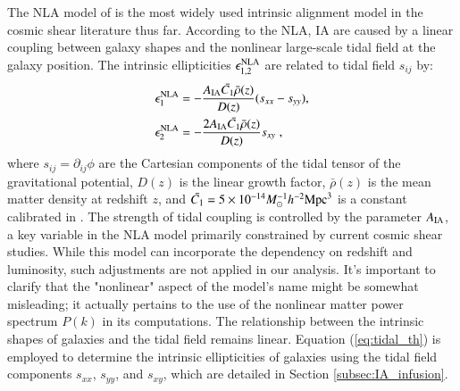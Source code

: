 The NLA model of \citet{NLA} is the most widely used intrinsic alignment model in the cosmic shear literature thus far.
According to the NLA, IA are caused by a linear coupling between galaxy shapes and the nonlinear large-scale tidal field at the galaxy position.
The intrinsic ellipticities $\epsilon_{1,2}^{\rm NLA}$ are related to tidal field $s_{ij}$ by:
\begin{equation}
\begin{split}
\epsilon_1^{\rm NLA} &= - \frac{A_{\rm IA}\bar{C_1}\bar{\rho}(z)}{D(z)} (s_{xx} - s_{yy}) , \\    \epsilon_2^{\rm NLA} &= - \frac{2 A_{\rm IA}\bar{C_1}\bar{\rho}(z)}{D(z)} s_{xy}\;,
\label{eq:tidal_th}
\end{split}
\end{equation}
where $s_{ij} = \partial_{ij}\phi$ are the Cartesian components of the tidal tensor of the gravitational potential,  $D(z)$ is the linear growth factor, $\bar{\rho}(z)$ is the mean matter density at redshift $z$, and $\bar{C_1}=5\times 10^{-14} M_{\odot}^{-1} h^{-2} {\rm Mpc}^3$ is a constant calibrated in \citet{Brown2002}. 
The strength of tidal coupling is controlled by the parameter $A_{\rm IA}$, a key variable in the NLA model primarily constrained by current cosmic shear studies.
While this model can incorporate the dependency  on redshift and luminosity, such adjustments are not applied in our analysis.
It's important to clarify that the "nonlinear" aspect of the model's name might be somewhat misleading; it actually pertains to the use of the nonlinear matter power spectrum $P(k)$ in its computations. 
The relationship between the intrinsic shapes of galaxies and the tidal field remains linear.
Equation (\ref{eq:tidal_th}) is employed to determine the intrinsic ellipticities of galaxies using the tidal field components $s_{xx}$, $s_{yy}$, and $s_{xy}$, which are detailed in Section \ref{subsec:IA_infusion}.

